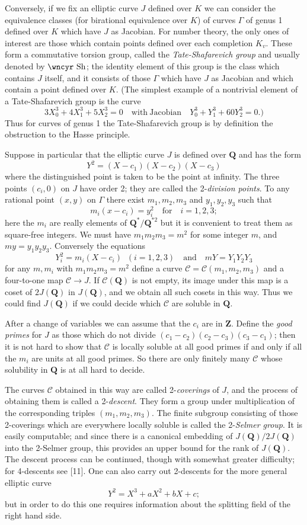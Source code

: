 \documentclass[12pt]{article}
\def\bQ{{\mathbf Q}}
\def\bZ{{\mathbf Z}}
\def\gG{{\Gamma}}
\def\sC{{\mathcal C}}
\def\Sha{\mbox{\wncyr Sh}}
\begin{document}
Conversely, if we fix an elliptic curve $J$ defined over $K$ we can consider
the equivalence classes (for birational equivalence over $K$) of curves $\gG$
of genus 1 defined over $K$ which have $J$ as Jacobian. For number theory, the
only ones of interest are those which contain points defined over each
completion $K_v$. These form a commutative torsion group, called
the \emph{Tate-Shafarevich group} and usually denoted by $\Sha$;
the identity element of this group is the
class which contains $J$ itself, and it consists of those $\gG$ which have $J$
as Jacobian and which contain a point defined over $K$. (The simplest example
of a nontrivial element of a Tate-Shafarevich group is the curve
\[ 3X_0^3+4X_1^3+5X_2^3=0 \quad {\mathrm{with~Jacobian}} \quad
Y_0^3+Y_1^3+60Y_2^3=0.) \]
Thus for curves of
genus 1 the Tate-Shafarevich group is by definition the obstruction to the
Hasse principle.

Suppose in particular that the elliptic curve $J$ is defined over $\bQ$ and
has the form
\[ Y^2=(X-c_1)(X-c_2)(X-c_3) \]
where the distinguished point is taken to be the point at infinity.
The three points $(c_i,0)$ on $J$ have order 2; they are called the
2-\emph{division points}. To any rational point $(x,y)$
on $\gG$ there exist $m_1,m_2,m_3$ and $y_1,y_2,y_3$
such that
\[ m_i(x-c_i)=y_i^2 \quad {\mathrm{for}} \quad i=1,2,3; \]
here the $m_i$ are really elements of $\bQ^*/\bQ^{*2}$ but it is convenient to
treat them as square-free integers. We must have $m_1m_2m_3=m^2$ for some
integer $m$, and $my=y_1y_2y_3$. Conversely the equations
\[ Y_i^2=m_i(X-c_i)\;\; (i=1,2,3) \quad {\mathrm{and}} \quad mY=Y_1Y_2Y_3 \]
for any $m,m_i$ with $m_1m_2m_3=m^2$
define a curve $\sC=\sC(m_1,m_2,m_3)$ and a four-to-one map $\sC\rightarrow J$.
If $\sC(\bQ)$ is not empty, its image under this map is a coset of $2J(\bQ)$
in $J(\bQ)$, and we obtain all such cosets in this way. Thus we could find
$J(\bQ)$ if we could decide which $\sC$ are soluble in $\bQ$.

After a change of variables
we can assume that the $c_i$ are in $\bZ$.
Define the \emph{good primes} for $J$ as those which do not divide
$(c_1-c_2)(c_2-c_3)(c_3-c_1)$; then it is not hard to show that $\sC$ is
locally soluble at
all good primes if and only if all the $m_i$ are units at all good primes.
So there are only finitely many $\sC$ whose solubility in $\bQ$
is at all hard to decide.

The curves $\sC$ obtained in this way are called 2-\emph{coverings} of $J$,
and the process of obtaining them is called a 2-\emph{descent}.
They form a group under multiplication of the corresponding triples
$(m_1,m_2,m_3)$. The finite subgroup consisting of those 2-coverings which
are everywhere locally soluble is called the 2-\emph{Selmer group}. It is
easily computable; and since there is a canonical embedding of $J(\bQ)/2J(\bQ)$
into the 2-Selmer group, this provides an upper bound for the rank of $J(\bQ)$.
The descent process can be continued, though with somewhat
greater difficulty; for 4-descents see [11]. One can also carry out
2-descents for the more general elliptic curve
\[ Y^2=X^3+aX^2+bX+c; \]
but in order to do this one requires information about the splitting field of
the right hand side.
\end{document}
